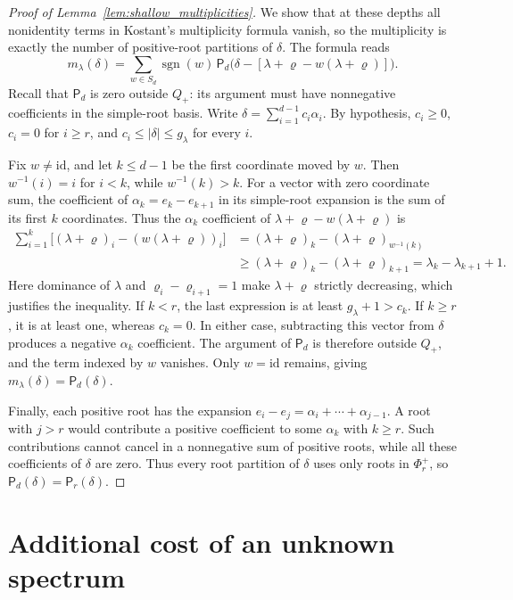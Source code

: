 \documentclass[a4paper,onecolumn,11pt]{quantumarticle}
\begin{document}
\begin{proof}[Proof of Lemma~\ref{lem:shallow_multiplicities}]
We show that at these depths all nonidentity terms in Kostant's
multiplicity formula vanish, so the multiplicity is exactly the
number of positive-root partitions of $\delta$. The formula
\cite{kostant1959multiplicity} reads
\[
m_\lambda(\delta)
=\sum_{w\in S_d}\operatorname{sgn}(w)\,
\mathsf P_d\bigl(\delta-[\lambda+\varrho-w(\lambda+\varrho)]\bigr).
\]
Recall that $\mathsf P_d$ is zero outside $Q_+$: its argument must
have nonnegative coefficients in the simple-root basis.
Write $\delta=\sum_{i=1}^{d-1}c_i\alpha_i$. By hypothesis,
$c_i\ge0$, $c_i=0$ for $i\ge r$, and
$c_i\le|\delta|\le g_\lambda$ for every $i$.

Fix $w\ne\mathrm{id}$, and let $k\le d-1$ be the first coordinate
moved by $w$. Then $w^{-1}(i)=i$ for $i<k$, while $w^{-1}(k)>k$.
For a vector with zero coordinate sum, the coefficient of
$\alpha_k=e_k-e_{k+1}$ in its simple-root expansion is the sum
of its first $k$ coordinates. Thus the $\alpha_k$ coefficient of
$\lambda+\varrho-w(\lambda+\varrho)$ is
\begin{align*}
\sum_{i=1}^k\bigl[(\lambda+\varrho)_i
 -(w(\lambda+\varrho))_i\bigr]
&=(\lambda+\varrho)_k-(\lambda+\varrho)_{w^{-1}(k)}\\
&\ge(\lambda+\varrho)_k-(\lambda+\varrho)_{k+1}=\lambda_k-\lambda_{k+1}+1.
\end{align*}
Here dominance of $\lambda$ and
$\varrho_i-\varrho_{i+1}=1$ make $\lambda+\varrho$ strictly decreasing,
which justifies the inequality.
If $k<r$, the last expression is at least $g_\lambda+1>c_k$.
If $k\ge r$, it is at least one, whereas $c_k=0$.
In either case, subtracting this vector from $\delta$ produces a
negative $\alpha_k$ coefficient. The argument of $\mathsf P_d$
is therefore outside $Q_+$, and the term indexed by $w$ vanishes.
Only $w=\mathrm{id}$ remains, giving
$m_\lambda(\delta)=\mathsf P_d(\delta)$.

Finally, each positive root has the expansion
$e_i-e_j=\alpha_i+\cdots+\alpha_{j-1}$. A root with $j>r$
would contribute a positive coefficient to some $\alpha_k$ with
$k\ge r$. Such contributions cannot cancel in a nonnegative sum
of positive roots, while all these coefficients of $\delta$ are zero.
Thus every root partition of $\delta$ uses only roots in
$\Phi_r^+$, so $\mathsf P_d(\delta)=\mathsf P_r(\delta)$.
\end{proof}


\section{Additional cost of an unknown spectrum}\label{app:unknown_spectrum}
\end{document}
